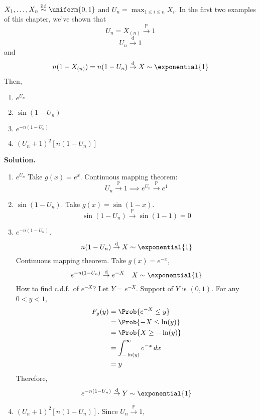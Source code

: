 \begin{Example}{}{}
    $ X_1,\ldots,X_n \stackrel{\text{iid}}{\sim}\uniform{0,1} $
    and $ U_n=\max_{1\le i\le n}X_i $. In the first two examples
    of this chapter, we've shown that
    \[ U_n=X_{(n)}\stackrel{\mathbb{P}}{\to}1 \]
    \[ U_n\stackrel{\text{d}}{\to}1 \]
    and
    \[ n(1-X_{(n)})=n(1-U_n)\stackrel{\text{d}}{\to} X \sim \exponential{1} \]
    Then,
    \begin{enumerate}[label=(\roman*)]
        \item $ e^{U_n} $
        \item $ \sin(1-U_n) $
        \item $ e^{-n(1-U_n)} $
        \item $ (U_n+1)^2[n(1-U_n)] $
    \end{enumerate}
    \textbf{Solution.}
    \begin{enumerate}[label=(\roman*)]
        \item $ e^{U_n} $
              Take $ g(x)=e^x $. Continuous mapping theorem:
              \[ U_n\stackrel{\mathbb{P}}{\to}1\implies e^{U_n}
                  \stackrel{\mathbb{P}}{\to} e^1 \]
        \item $ \sin(1-U_n) $. Take $ g(x)=\sin(1-x) $.
              \[ \sin(1-U_n)\stackrel{\mathbb{P}}{\to}\sin(1-1)=0 \]
        \item $ e^{-n(1-U_n)} $.
              \[ n(1-U_n)\stackrel{\text{d}}{\to} X \sim \exponential{1} \]
              Continuous mapping theorem. Take $ g(x)=e^{-x} $,
              \[ e^{-n(1-U_n)}\stackrel{\text{d}}{\to}e^{-X}\quad X \sim \exponential{1} \]
              How to find c.d.f.\ of $ e^{-X} $? Let $ Y=e^{-X} $.
              Support of $ Y $ is $ (0,1) $. For any $ 0<y<1 $,
              \begin{align*}
                  F_y(y)
                   & =\Prob{e^{-X}\le y}                    \\
                   & =\Prob{-X\le \ln(y)}                   \\
                   & =\Prob{X\ge -\ln(y)}                   \\
                   & =\int_{-\ln(y)}^{\infty} e^{-x}\, d{x} \\
                   & =y
              \end{align*}
              Therefore,
              \[ e^{-n(1-U_n)}\stackrel{\text{d}}{\to} Y \sim \exponential{1} \]
        \item $ (U_n+1)^2[n(1-U_n)] $. Since $ U_n\stackrel{\mathbb{P}}{\to}1 $,

\end{enumerate}
\end{Example}
